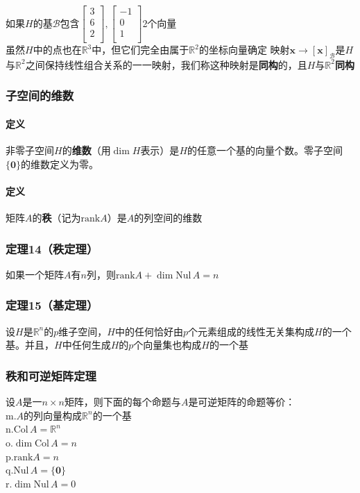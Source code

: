\documentclass{article}
\newcommand{\ve}{\boldsymbol}
\begin{document}
\begin{CJK}{UTF8}{gkai}
如果$H$的基$\mathcal{B}$包含$\begin{bmatrix}3\\6\\2\\ \end{bmatrix},\begin{bmatrix}-1\\0\\1\\ \end{bmatrix}$2个向量\\
虽然$H$中的点也在$\mathbb{R}^3$中，但它们完全由属于$\mathbb{R}^2$的坐标向量确定
映射$\ve{x}\to[\ve{x}]_{\mathcal{B}}$是$H$与$\mathbb{R}^2$之间保持线性组合关系的一一映射，我们称这种映射是\textbf{同构}的，且$H$与$\mathbb{R}^2$\textbf{同构}\\
\subsubsection{子空间的维数}
\paragraph{定义\\}
非零子空间$H$的\textbf{维数}（用$\dim H$表示）是$H$的任意一个基的向量个数。零子空间$\{\ve{0}\}$的维数定义为零。\\
\paragraph{定义\\}
矩阵$A$的\textbf{秩}（记为$\text{rank} A$）是$A$的列空间的维数\\
\subsubsection{定理14（秩定理）}
如果一个矩阵$A$有$n$列，则$\text{rank} A+\dim \text{Nul} \,A=n$\\
\subsubsection{定理15（基定理）}
设$H$是$\mathbb{R}^n$的$p$维子空间，$H$中的任何恰好由$p$个元素组成的线性无关集构成$H$的一个基。并且，$H$中任何生成$H$的$p$个向量集也构成$H$的一个基\\
\subsubsection{秩和可逆矩阵定理}
设$A$是一$n\times n$矩阵，则下面的每个命题与$A$是可逆矩阵的命题等价：\\
m.$A$的列向量构成$\mathbb{R}^n$的一个基\\
n.$\text{Col}\, A=\mathbb{R}^n$\\
o.$\dim \text{Col}\, A=n$\\
p.$\text{rank} A=n$\\
q.$\text{Nul}\, A=\{\ve{0}\}$\\
r.$\dim \text{Nul}\, A=0$\\


\end{CJK}
\end{document}
